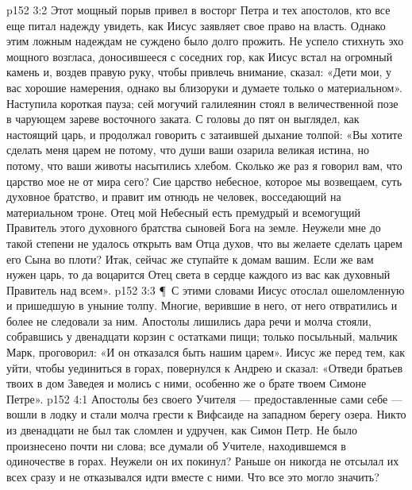\vs p152 3:2 Этот мощный порыв привел в восторг Петра и тех апостолов, кто все еще питал надежду увидеть, как Иисус заявляет свое право на власть. Однако этим ложным надеждам не суждено было долго прожить. Не успело стихнуть эхо мощного возгласа, доносившееся с соседних гор, как Иисус встал на огромный камень и, воздев правую руку, чтобы привлечь внимание, сказал: «Дети мои, у вас хорошие намерения, однако вы близоруки и думаете только о материальном». Наступила короткая пауза; сей могучий галилеянин стоял в величественной позе в чарующем зареве восточного заката. С головы до пят он выглядел, как настоящий царь, и продолжал говорить с затаившей дыхание толпой: «Вы хотите сделать меня царем не потому, что души ваши озарила великая истина, но потому, что ваши животы насытились хлебом. Сколько же раз я говорил вам, что царство мое не от мира сего? Сие царство небесное, которое мы возвещаем, суть духовное братство, и правит им отнюдь не человек, восседающий на материальном троне. Отец мой Небесный есть премудрый и всемогущий Правитель этого духовного братства сыновей Бога на земле. Неужели мне до такой степени не удалось открыть вам Отца духов, что вы желаете сделать царем его Сына во плоти? Итак, сейчас же ступайте к домам вашим. Если же вам нужен царь, то да воцарится Отец света в сердце каждого из вас как духовный Правитель над всем».
\vs p152 3:3 \P\ С этими словами Иисус отослал ошеломленную и пришедшую в уныние толпу. Многие, верившие в него, от него отвратились и более не следовали за ним. Апостолы лишились дара речи и молча стояли, собравшись у двенадцати корзин с остатками пищи; только посыльный, мальчик Марк, проговорил: «И он отказался быть нашим царем». Иисус же перед тем, как уйти, чтобы уединиться в горах, повернулся к Андрею и сказал: «Отведи братьев твоих в дом Заведея и молись с ними, особенно же о брате твоем Симоне Петре».
\vs p152 4:1 Апостолы без своего Учителя --- предоставленные сами себе --- вошли в лодку и стали молча грести к Вифсаиде на западном берегу озера. Никто из двенадцати не был так сломлен и удручен, как Симон Петр. Не было произнесено почти ни слова; все думали об Учителе, находившемся в одиночестве в горах. Неужели он их покинул? Раньше он никогда не отсылал их всех сразу и не отказывался идти вместе с ними. Что все это могло значить?
